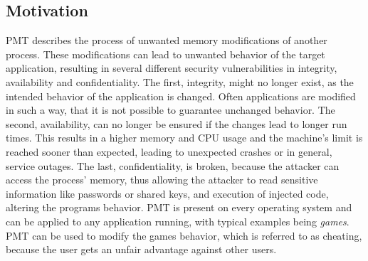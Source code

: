 \subsection{Motivation}
\gls{PMT} describes the process of unwanted memory modifications of another process. These modifications can lead to unwanted behavior of the target application, resulting in several different security vulnerabilities in integrity, availability and confidentiality. The first, integrity, might no longer exist, as the intended behavior of the application is changed. Often applications are modified in such a way, that it is not possible to guarantee unchanged behavior. The second, availability, can no longer be ensured if the changes lead to longer run times. This results in a higher memory and CPU usage and the machine's limit is reached sooner than expected, leading to unexpected crashes or in general, service outages. The last, confidentiality, is broken, because the attacker can access the process' memory, thus allowing the attacker to read sensitive information like passwords or shared keys, and execution of injected code, altering the programs behavior. \gls{PMT} is present on every operating system and can be applied to any application running, with typical examples being \emph{games}. \gls{PMT} can be used to modify the games behavior, which is referred to as cheating, because the user gets an unfair advantage against other users.